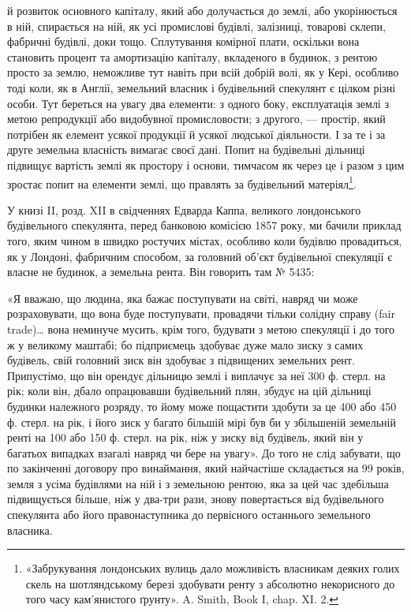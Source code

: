 \parcont{}  %
й розвиток основного капіталу, який або долучається до землі, або укорінюється
в ній, спирається на ній, як усі промислові будівлі, залізниці, товарові склепи,
фабричні будівлі, доки тощо. Сплутування комірної плати, оскільки вона становить
процент та амортизацію капіталу, вкладеного в будинок, з рентою просто за
землю, неможливе тут навіть при всій добрій волі, як у Кері, особливо тоді
коли, як в Англії, земельний власник і будівельний спекулянт є цілком різні
особи. Тут береться на увагу два елементи: з одного боку, експлуатація землі
з метою репродукції або видобувної промисловости; з другого, — простір, який
потрібен як елемент усякої продукції й усякої людської діяльности. І за те і за
друге земельна власність вимагає своєї дані. Попит на будівельні дільниці підвищує
вартість землі як простору і основи, тимчасом як через це і разом
з цим зростає попит на елементи землі, що правлять за будівельний матеріял\footnote{
«Забрукування лондонських вулиць дало можливість власникам деяких голих скель на шотляндському
березі здобувати ренту з абсолютно некорисного до того часу кам’янистого ґрунту». A. Smith, Book I,
chap. XI. 2.
}.

У книзі II, розд. XII в свідченнях Едварда Каппа, великого лондонського
будівельного спекулянта, перед банковою комісією 1857 року, ми бачили приклад
того, яким чином в швидко ростучих містах, особливо коли будівлю провадиться,
як у Лондоні, фабричним способом, за головний об’єкт будівельної
спекуляції є власне не будинок, а земельна рента. Він говорить там № 5435:

«Я вважаю, що людина, яка бажає поступувати на світі, навряд чи може
розраховувати, що вона буде поступувати, провадячи тільки солідну справу (fair
trade)\dots{} вона неминуче мусить, крім того, будувати з метою спекуляції і до
того ж у великому маштабі; бо підприємець здобуває дуже мало зиску з самих
будівель, свій головний зиск він здобуває з підвищених земельних рент. Припустімо,
що він орендує дільницю землі і виплачує за неї 300 ф. стерл. на рік;
коли він, дбало опрацювавши будівельний плян, збудує на цій дільниці будинки
належного розряду, то йому може пощастити здобути за це 400 або 450 ф. стерл.
на рік, і його зиск у багато більшій мірі був би у збільшеній земельній ренті
на 100 або 150 ф. стерл. на рік, ніж у зиску від будівель, який він у багатьох
випадках взагалі навряд чи бере на увагу». До того не слід забувати, що
по закінченні договору про винаймання, який найчастіше складається на 99 років,
земля з усіма будівлями на ній і з земельною рентою, яка за цей час
здебільша підвищується більше, ніж у два-три рази, знову повертається від
будівельного спекулянта або його правонаступника до первісного останнього
земельного власника.

